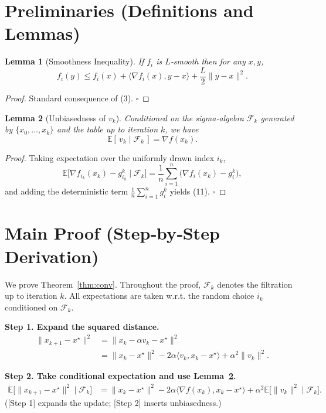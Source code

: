 \documentclass{article}
\newtheorem{lemma}{Lemma}
\begin{document}
\newpage

\section*{Preliminaries (Definitions and Lemmas)}
\begin{lemma}[Smoothness Inequality]\label{lem:smooth}
If $f_i$ is $L$‑smooth then for any $x,y$,
\[
f_i(y)\le f_i(x)+\langle\nabla f_i(x),y-x\rangle
          +\frac{L}{2}\|y-x\|^2 .
\tag{10}
\]
\end{lemma}
\begin{proof}
Standard consequence of (3). $\square$
\end{proof}

\begin{lemma}[Unbiasedness of $v_k$]\label{lem:unbiased}
Conditioned on the sigma‑algebra $\mathcal{F}_k$ generated by
$\{x_0,\dots,x_k\}$ and the table up to iteration $k$, we have
\[
\mathbb{E}[\,v_k\mid\mathcal{F}_k\,]=\nabla f(x_k).
\tag{11}
\]
\end{lemma}
\begin{proof}
Taking expectation over the uniformly drawn index $i_k$,
\[
\mathbb{E}\bigl[\nabla f_{i_k}(x_k)-g_{i_k}^{k}\mid\mathcal{F}_k\bigr]
   =\frac1n\sum_{i=1}^{n}\bigl(\nabla f_i(x_k)-g_i^{k}\bigr),
\]
and adding the deterministic term $\frac1n\sum_{i=1}^{n} g_i^{k}$ yields (11). $\square$
\end{proof}

\section*{Main Proof (Step‑by‑Step Derivation)}
We prove Theorem~\ref{thm:conv}.  Throughout the proof,
$\mathcal{F}_k$ denotes the filtration up to iteration $k$.
All expectations are taken w.r.t. the random choice $i_k$ conditioned on $\mathcal{F}_k$.

\bigskip
\noindent\textbf{Step 1. Expand the squared distance.}
\begin{align}
\|x_{k+1}-x^\star\|^2
&= \|x_k-\alpha v_k-x^\star\|^2 \nonumber\\
&= \|x_k-x^\star\|^2 -2\alpha\langle v_k, x_k-x^\star\rangle
   +\alpha^2\|v_k\|^2 .
\tag{12}
\end{align}

\noindent\textbf{Step 2. Take conditional expectation and use Lemma~\ref{lem:unbiased}.}
\begin{align}
\mathbb{E}\bigl[\|x_{k+1}-x^\star\|^2\mid\mathcal{F}_k\bigr]
&= \|x_k-x^\star\|^2 -2\alpha\langle\nabla f(x_k),x_k-x^\star\rangle
   +\alpha^2\mathbb{E}\bigl[\|v_k\|^2\mid\mathcal{F}_k\bigr] .
\tag{13}
\end{align}
([Step 1] expands the update; [Step 2] inserts unbiasedness.)
\end{document}
